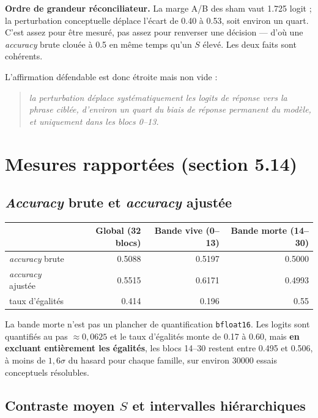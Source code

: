 \documentclass[11pt,a4paper]{article}
\newcommand{\code}[1]{\texttt{\small #1}}
\begin{document}
\textbf{Ordre de grandeur réconciliateur.} La marge A/B des sham vaut \num{1.725} logit ;
la perturbation conceptuelle déplace l'écart de \num{0.40} à \num{0.53}, soit environ un
quart. C'est assez pour être mesuré, pas assez pour renverser une décision --- d'où une
\emph{accuracy} brute clouée à \num{0.5} en même temps qu'un $S$ élevé. Les deux faits
sont cohérents.

\medskip
\noindent
L'affirmation défendable est donc étroite mais non vide :

\begin{quote}
\emph{la perturbation déplace systématiquement les logits de réponse vers la phrase
ciblée, d'environ un quart du biais de réponse permanent du modèle, et uniquement dans
les blocs 0--13.}
\end{quote}

\section{Mesures rapportées (section 5.14)}

\subsection{\emph{Accuracy} brute et \emph{accuracy} ajustée}

\begin{center}
\begin{tabular}{lrrr}
\toprule
& Global (32 blocs) & Bande vive (0--13) & Bande morte (14--30) \\
\midrule
\emph{accuracy} brute   & \num{0.5088} & \num{0.5197} & \num{0.5000} \\
\emph{accuracy} ajustée & \num{0.5515} & \num{0.6171} & \num{0.4993} \\
taux d'égalités         & \num{0.414}  & \num{0.196}  & \num{0.55}   \\
\bottomrule
\end{tabular}
\end{center}

\noindent
La bande morte n'est pas un plancher de quantification \code{bfloat16}. Les logits sont
quantifiés au pas $\approx 0{,}0625$ et le taux d'égalités monte de \num{0.17} à
\num{0.60}, mais \textbf{en excluant entièrement les égalités}, les blocs 14--30 restent
entre \num{0.495} et \num{0.506}, à moins de $1{,}6\sigma$ du hasard pour chaque famille,
sur environ \num{30000} essais conceptuels résolubles.

\subsection{Contraste moyen \texorpdfstring{$S$}{S} et intervalles hiérarchiques}
\label{sec:S}
\end{document}
